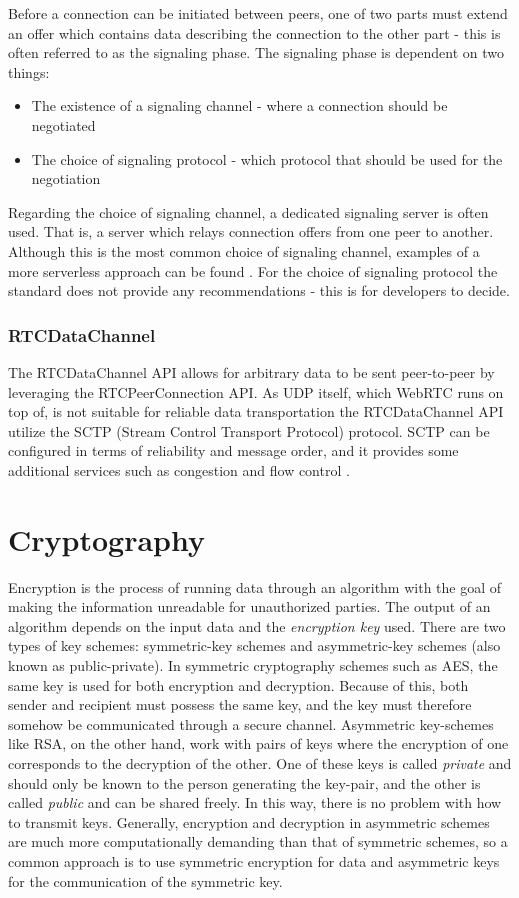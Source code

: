 Before a connection can be initiated between peers, one of two parts must extend an offer which contains data describing the connection to the other part - this is often referred to as the signaling phase. The signaling phase is dependent on two things:

\begin{itemize}
  \item The existence of a signaling channel - where a connection should be negotiated
  \item The choice of signaling protocol - which protocol that should be used for the negotiation
\end{itemize}

Regarding the choice of signaling channel, a dedicated signaling server is often used. That is, a server which relays connection offers from one peer to another. Although this is the most common choice of signaling channel, examples of a more serverless approach can be found \cite{webrtcsignalserver}. For the choice of signaling protocol the standard does not provide any recommendations - this is for developers to decide.

\subsubsection{RTCDataChannel}
The RTCDataChannel API allows for arbitrary data to be sent peer-to-peer by leveraging the RTCPeerConnection API. As UDP itself, which WebRTC runs on top of, is not suitable for reliable data transportation the RTCDataChannel API utilize the SCTP (Stream Control Transport Protocol) protocol. SCTP can be configured in terms of reliability and message order, and it provides some additional services such as congestion and flow control \cite{HighPerfBrowserNetworking:Online}.

\section{Cryptography}
Encryption is the process of running data through an algorithm with the goal of making the information unreadable for unauthorized parties. The output of an algorithm depends on the input data and the \emph{encryption key} used. There are two types of key schemes: symmetric-key schemes and asymmetric-key schemes (also known as public-private). In symmetric cryptography  schemes such as AES, the same key is used for both encryption and decryption. Because of this, both sender and recipient must possess the same key, and the key must therefore somehow be communicated through a secure channel. Asymmetric key-schemes like RSA, on the other hand, work with pairs of keys where the encryption of one corresponds to the decryption of the other. One of these keys is called \emph{private} and should only be known to the person generating the key-pair, and the other is called \emph{public} and can be shared freely. In this way, there is no problem with how to transmit keys. Generally, encryption and decryption in asymmetric schemes are much more computationally demanding than that of symmetric schemes, so a common approach is to use symmetric encryption for data and asymmetric keys for the communication of the symmetric key.


